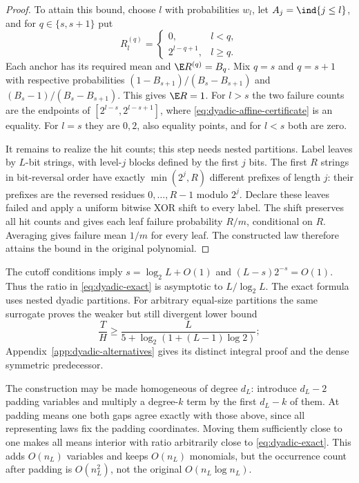 \begin{proof}
To attain this bound, choose $l$ with probabilities $w_l$, let
$A_j=\ind\{j\le l\}$, and for $q\in\{s,s+1\}$ put
\[
 R_l^{(q)}=\begin{cases}0,&l<q,\\2^{l-q+1},&l\ge q.\end{cases}
\]
Each anchor has its required mean and $\E R^{(q)}=B_q$. Mix $q=s$ and
$q=s+1$ with respective probabilities
$(1-B_{s+1})/(B_s-B_{s+1})$ and $(B_s-1)/(B_s-B_{s+1})$.
This gives $\E R=1$. For $l>s$ the two failure counts are the endpoints
of $[2^{l-s},2^{l-s+1}]$, where \eqref{eq:dyadic-affine-certificate}
is an equality. For $l=s$ they are $0,2$, also equality points, and for
$l<s$ both are zero.

It remains to realize the hit counts; this step needs nested partitions.
Label leaves by $L$-bit strings, with level-$j$ blocks defined by the first
$j$ bits. The first $R$ strings in bit-reversal order have exactly
$\min(2^j,R)$ different prefixes of length $j$: their prefixes are the
reversed residues $0,\ldots,R-1$ modulo $2^j$. Declare these leaves failed
and apply a uniform bitwise XOR shift to every label. The shift preserves
all hit counts and gives each leaf failure probability $R/m$, conditional
on $R$. Averaging gives failure mean $1/m$ for every leaf. The constructed
law therefore attains the bound in the original polynomial.
\end{proof}

The cutoff conditions imply $s=\log_2 L+O(1)$ and $(L-s)2^{-s}=O(1)$.
Thus the ratio in \eqref{eq:dyadic-exact} is asymptotic to
$L/\log_2 L$. The exact formula uses nested dyadic partitions.
For arbitrary equal-size partitions the same surrogate proves the weaker
but still divergent lower bound
\begin{equation}\label{eq:arbitrary-partitions}
 \frac{T}{H}\ge\frac{L}{5+\log_2(1+(L-1)\log2)};
\end{equation}
Appendix~\ref{app:dyadic-alternatives} gives its distinct integral proof
and the dense symmetric predecessor.

The construction may be made homogeneous of degree $d_L$: introduce
$d_L-2$ padding variables and multiply a degree-$k$ term by the first
$d_L-k$ of them. At padding means one both gaps agree exactly with those
above, since all representing laws fix the padding coordinates. Moving
them sufficiently close to one makes all means interior with ratio
arbitrarily close to \eqref{eq:dyadic-exact}. This adds $O(n_L)$ variables
and keeps $O(n_L)$ monomials, but the occurrence count after padding is
$O(n_L^2)$, not the original $O(n_L\log n_L)$.

